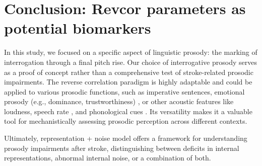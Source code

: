 \section {Conclusion: Revcor parameters as potential biomarkers} 

In this study, we focused on a specific aspect of linguistic prosody: the marking of interrogation through a final pitch rise. Our choice of interrogative prosody serves as a proof of concept rather than a comprehensive test of stroke-related prosodic impairments. The reverse correlation paradigm is highly adaptable and could be applied to various prosodic functions, such as imperative sentences, emotional prosody (e.g., dominance, trustworthiness) \cite{ponsot_cracking_2018}, or other acoustic features like loudness, speech rate \cite{goupil_listeners_2021}, and phonological cues \cite{osses_prosodic_2023}. Its versatility makes it a valuable tool for mechanistically assessing prosodic perception across different contexts. 

Ultimately, representation + noise model offers a framework for understanding prosody impairments after stroke, distinguishing between deficits in internal representations, abnormal internal noise, or a combination of both.

